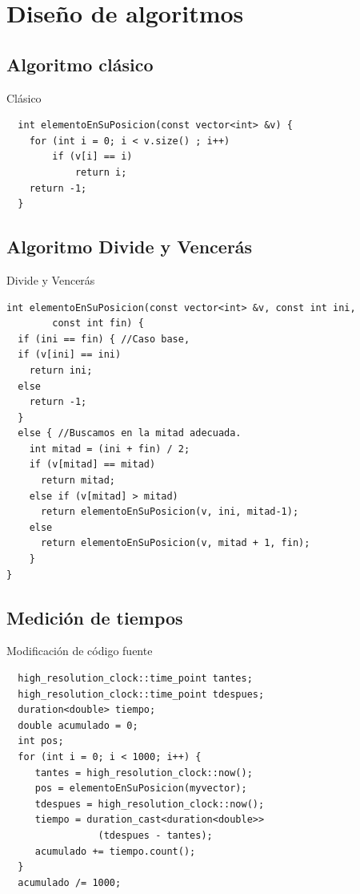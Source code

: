 \documentclass{beamer}
\begin{document}
\section{Diseño de algoritmos}

\subsection{Algoritmo clásico}

\begin{frame}[fragile]{Clásico}
\begin{verbatim}
  int elementoEnSuPosicion(const vector<int> &v) {
  	for (int i = 0; i < v.size() ; i++)
  		if (v[i] == i)
			return i;
	return -1;
  }
\end{verbatim}  
\end{frame}

\subsection{Algoritmo Divide y Vencerás}

\begin{frame}[fragile]{Divide y Vencerás}
\begin{verbatim}
int elementoEnSuPosicion(const vector<int> &v, const int ini, 
		const int fin) {
  if (ini == fin) {	//Caso base,
  if (v[ini] == ini)
    return ini;
  else
    return -1;
  }
  else { //Buscamos en la mitad adecuada.
    int mitad = (ini + fin) / 2;
    if (v[mitad] == mitad)
      return mitad;
    else if (v[mitad] > mitad)
      return elementoEnSuPosicion(v, ini, mitad-1);
    else
      return elementoEnSuPosicion(v, mitad + 1, fin);
    }
}	
\end{verbatim}  
\end{frame}

\subsection{Medición de tiempos}

\begin{frame}[fragile]{Modificación de código fuente}
\begin{verbatim}
  high_resolution_clock::time_point tantes;
  high_resolution_clock::time_point tdespues;
  duration<double> tiempo;
  double acumulado = 0;
  int pos;
  for (int i = 0; i < 1000; i++) {
	 tantes = high_resolution_clock::now();
	 pos = elementoEnSuPosicion(myvector);
	 tdespues = high_resolution_clock::now();
	 tiempo = duration_cast<duration<double>>
	 	        (tdespues - tantes);
	 acumulado += tiempo.count();
  }
  acumulado /= 1000;
\end{verbatim}
\end{frame}
\end{document}
